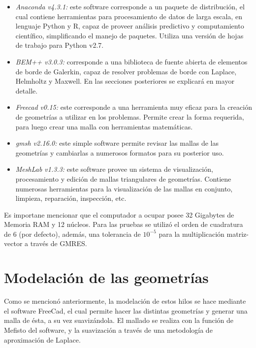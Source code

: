 \documentclass[12pt,letterpaper]{report}
\numberwithin{equation}{section}
\begin{document}
\begin{itemize}
	\item \textit{Anaconda v4.3.1:} este software corresponde a un paquete de distribución, el cual contiene herramientas para procesamiento de datos de larga escala, en lenguaje Python y R, capaz de proveer análisis predictivo y computamiento científico, simplificando el manejo de paquetes. Utiliza una versión de hojas de trabajo para Python v2.7.
	
	\item \textit{BEM++ v3.0.3:} corresponde a una biblioteca de fuente abierta de elementos de borde de Galerkin, capaz de resolver problemas de borde con Laplace, Helmholtz y Maxwell. En las secciones posteriores se explicará en mayor detalle.
	
	\item \textit{Freecad v0.15:} este corresponde a una herramienta muy eficaz para la creación de geometrías a utilizar en los problemas. Permite crear la forma requerida, para luego crear una malla con herramientas matemáticas.
	
	\item \textit{gmsh v2.16.0:} este simple software permite revisar las mallas de las geometrías y cambiarlas a numerosos formatos para su posterior uso.
	
	\item \textit{MeshLab v1.3.3:} este software provee un sistema de visualización, procesamiento y edición de mallas triangulares de geometrías. Contiene numerosas herramientas para la visualización de las mallas en conjunto, limpieza, reparación, inspección, etc. 
	
	
\end{itemize}


Es importane mencionar que el computador a ocupar posee 32 Gigabytes de Memoria RAM y 12 núcleos. Para las pruebas se utilizó el orden de cuadratura de 6 (por defecto), además, una tolerancia de $10^{-5}$ para la multiplicación matriz-vector a través de GMRES.

\chapter{Modelación de las geometrías}


Como se mencionó anteriormente, la modelación de estos hilos se hace mediante el software FreeCad, el cual permite hacer las distintas geometrías y generar una malla de ésta, a su vez suavizándola. El mallado se realiza con la función de Mefisto del software, y la suavización a través de una metodología de aproximación de Laplace.
\end{document}
